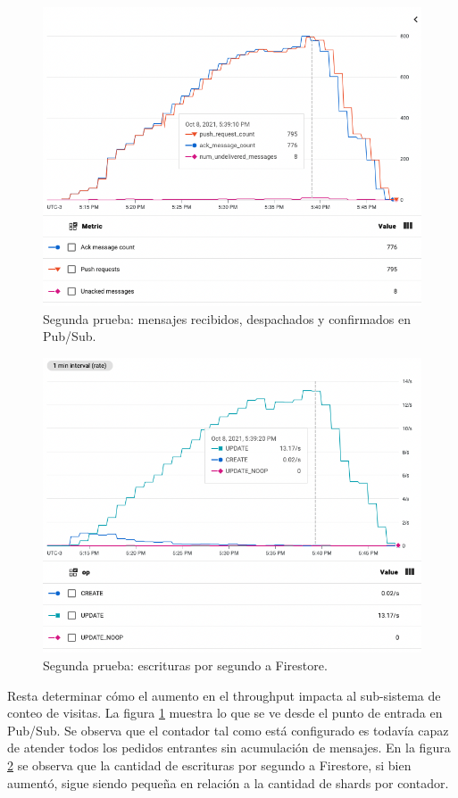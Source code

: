 \documentclass[11pt]{scrartcl}
\begin{document}
\begin{figure}
\centering
\includegraphics[scale=0.44]{img3/pubsub}
\caption{Segunda prueba: mensajes recibidos, despachados y confirmados en Pub/Sub.}
\label{fig:test-2-pubsub}
\end{figure}

\begin{figure}
\centering
\includegraphics[scale=0.44]{img3/firestore}
\caption{Segunda prueba: escrituras por segundo a Firestore.}
\label{fig:test-2-firestore}
\end{figure}

Resta determinar cómo el aumento en el throughput impacta al sub-sistema de conteo de visitas. La figura \ref{fig:test-2-pubsub} muestra lo que se ve desde el punto de entrada en Pub/Sub. Se observa que el contador tal como está configurado es todavía capaz de atender todos los pedidos entrantes sin acumulación de mensajes. En la figura \ref{fig:test-2-firestore} se observa que la cantidad de escrituras por segundo a Firestore, si bien aumentó, sigue siendo pequeña en relación a la cantidad de shards por contador.
\end{document}
